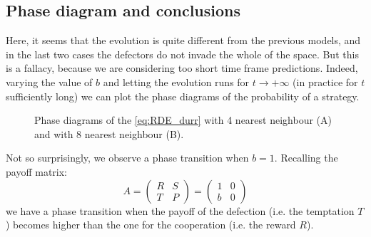 \subsection{Phase diagram and conclusions}

Here, it seems that the evolution is quite different from the previous
models, and in the last two cases the defectors do not invade the
whole of the space. But this is a fallacy, because we are considering
too short time frame predictions. Indeed, varying the value of $b$
and letting the evolution runs for $t\rightarrow+\infty$ (in practice
for $t$ sufficiently long) we can plot the phase diagrams of the
probability of a strategy.

\begin{figure}
\caption{Phase diagrams of the \ref{eq:RDE_durr} with 4 nearest neighbour
(A) and with 8 nearest neighbour (B).}
\end{figure}
Not so surprisingly, we observe a phase transition when $b=1$. Recalling
the payoff matrix:
\[
A=\left(\begin{array}{cc}
R & S\\
T & P
\end{array}\right)=\left(\begin{array}{cc}
1 & 0\\
b & 0
\end{array}\right)
\]
 we have a phase transition when the payoff of the defection (i.e.
the temptation $T$) becomes higher than the one for the cooperation
(i.e. the reward $R$). 
